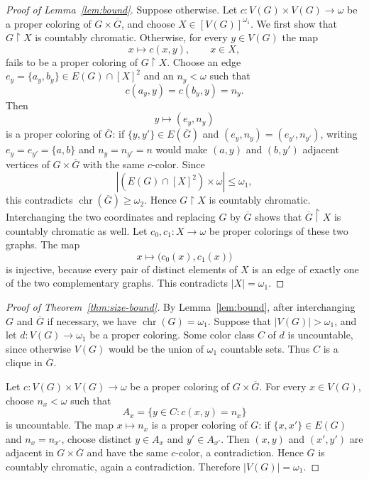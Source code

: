 \documentclass[10pt,a4paper]{amsart}
\numberwithin{equation}{section}
\theoremstyle{definition}
\theoremstyle{remark}
\newcommand{\chr}{\operatorname{chr}}
\newcommand{\restr}{\mathbin{\upharpoonright}}
\begin{document}
\begin{proof}[Proof of Lemma~\ref{lem:bound}]
Suppose otherwise.  Let
$c:V(G)\times V(G)\to\omega$ be a proper coloring of
$G\times\overline G$, and choose $X\in[V(G)]^{\omega_1}$.  We first
show that $G\restr X$ is countably chromatic.  Otherwise, for every
$y\in V(G)$ the map
\begin{displaymath}
 x\longmapsto c(x,y),\qquad x\in X,
\end{displaymath}
fails to be a proper coloring of $G\restr X$.  Choose an edge
$e_y=\{a_y,b_y\}\in E(G)\cap[X]^2$ and an $n_y<\omega$ such that
\begin{displaymath}
 c(a_y,y)=c(b_y,y)=n_y.
\end{displaymath}
Then
\begin{displaymath}
 y\longmapsto(e_y,n_y)
\end{displaymath}
is a proper coloring of $\overline G$: if $\{y,y'\}\in E(\overline G)$
and $(e_y,n_y)=(e_{y'},n_{y'})$, writing
$e_y=e_{y'}=\{a,b\}$ and $n_y=n_{y'}=n$ would make $(a,y)$ and
$(b,y')$ adjacent vertices of $G\times\overline G$ with the same
$c$-color.  Since
\begin{displaymath}
 |(E(G)\cap[X]^2)\times\omega|\leq\omega_1,
\end{displaymath}
this contradicts $\chr(\overline G)\geq\omega_2$.  Hence
$G\restr X$ is countably chromatic.  Interchanging the two coordinates
and replacing $G$ by $\overline G$ shows that
$\overline G\restr X$ is countably chromatic as well.  Let
$c_0,c_1:X\to\omega$ be proper colorings of these two graphs.  The map
\begin{displaymath}
 x\longmapsto\bigl(c_0(x),c_1(x)\bigr)
\end{displaymath}
is injective, because every pair of distinct elements of $X$ is an
edge of exactly one of the two complementary graphs.  This contradicts
$|X|=\omega_1$.
\end{proof}



\begin{proof}[Proof of Theorem~\ref{thm:size-bound}]
By Lemma~\ref{lem:bound}, after interchanging $G$ and $\overline G$
if necessary, we have $\chr(G)=\omega_1$.  Suppose that
$|V(G)|>\omega_1$, and let $d:V(G)\to\omega_1$ be a proper coloring.
Some color class $C$ of $d$ is uncountable, since otherwise $V(G)$
would be the union of $\omega_1$ countable sets.  Thus $C$ is a clique
in $\overline G$.

Let $c:V(G)\times V(G)\to\omega$ be a proper coloring of
$G\times\overline G$.  For every $x\in V(G)$, choose $n_x<\omega$ such
that
\begin{displaymath}
 A_x=\{y\in C:c(x,y)=n_x\}
\end{displaymath}
is uncountable.  The map $x\mapsto n_x$ is a proper coloring of
$G$: if $\{x,x'\}\in E(G)$ and $n_x=n_{x'}$, choose distinct
$y\in A_x$ and $y'\in A_{x'}$.  Then $(x,y)$ and $(x',y')$ are
adjacent in $G\times\overline G$ and have the same $c$-color, a
contradiction.  Hence $G$ is countably chromatic, again a
contradiction.  Therefore $|V(G)|=\omega_1$.
\end{proof}
\end{document}
